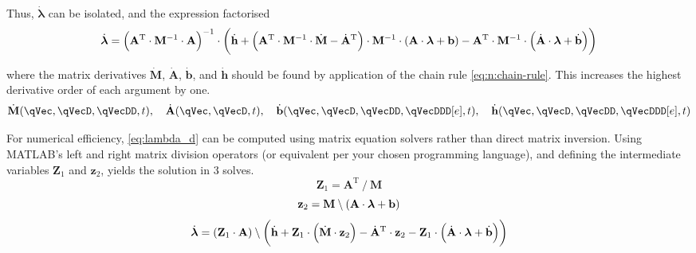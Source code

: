 \documentclass[11pt]{article}
\begin{document}
Thus, $\dot{\bm{\lambda}}$ can be isolated, and the expression factorised
\begin{equation} \label{eq:lambda_d}
\dot{\bm{\lambda}}
    = \del{\mathbf{A}^{\mathrm{T}} \cdot \mathbf{M}^{-1} \cdot \mathbf{A}}^{-1} \cdot
    \del{
        \dot{\mathbf{h}}
        + \del{\mathbf{A}^{\mathrm{T}} \cdot \mathbf{M}^{-1} \cdot \dot{\mathbf{M}} - \dot{\mathbf{A}}^{\mathrm{T}}}
        \cdot \mathbf{M}^{-1} \cdot \del{\mathbf{A} \cdot \bm{\lambda} + \mathbf{b}}
        - \mathbf{A}^{\mathrm{T}} \cdot \mathbf{M}^{-1} \cdot \del{\dot{\mathbf{A}} \cdot \bm{\lambda} + \dot{\mathbf{b}}}
    }
\end{equation}

where the matrix derivatives $\dot{\mathbf{M}}$, $\dot{\mathbf{A}}$, $\dot{\mathbf{b}}$, and $\dot{\mathbf{h}}$ should be found by application of the chain rule \eqref{eq:n:chain-rule}. This increases the highest derivative order of each argument by one.
\begin{equation}
    \dot{\mathbf{M}}(\qVec, \qVecD, \qVecDD, t) ,\quad
    \dot{\mathbf{A}}(\qVec, \qVecD, t) ,\quad
    \dot{\mathbf{b}}(\qVec, \qVecD, \qVecDD, \qVecDDD[e], t) ,\quad
    \dot{\mathbf{h}}(\qVec, \qVecD, \qVecDD, \qVecDDD[e], t)
\end{equation}

For numerical efficiency, \eqref{eq:lambda_d} can be computed using matrix equation solvers rather than direct matrix inversion. Using MATLAB's left and right matrix division operators (or equivalent per your chosen programming language), and defining the intermediate variables $\mathbf{Z}_1$ and $\mathbf{z}_2$, yields the solution in 3 solves.
\begin{equation}
\mathbf{Z}_1 = \mathbf{A}^{\mathrm{T}} \mathbin{/} \mathbf{M}
\end{equation}
\begin{equation}
\mathbf{z}_2 = \mathbf{M} \mathbin{\backslash} \del{\mathbf{A} \cdot \bm{\lambda} + \mathbf{b}}
\end{equation}
\begin{equation}
\dot{\bm{\lambda}}
    = \del{\mathbf{Z}_1 \cdot \mathbf{A}} \mathbin{\backslash}
    \del{
        \dot{\mathbf{h}}
        + \mathbf{Z}_1 \cdot \del{\dot{\mathbf{M}} \cdot \mathbf{z}_2}
        - \dot{\mathbf{A}}^{\mathrm{T}} \cdot \mathbf{z}_2
        - \mathbf{Z}_1 \cdot \del{\dot{\mathbf{A}} \cdot \bm{\lambda} + \dot{\mathbf{b}}}
    }
\end{equation}


\end{document}
